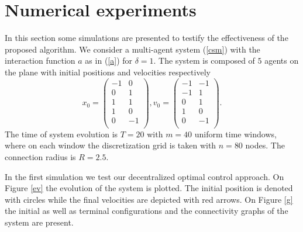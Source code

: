 \documentclass[a4paper,10pt, english]{article}
\begin{document}
 \section{Numerical experiments}
In this section some simulations are presented to testify the effectiveness of the proposed algorithm. We consider a multi-agent system (\ref{csm}) with the interaction function 
$a$ as in (\ref{a}) for $\delta = 1$. The system is composed of $5$
agents on the plane with initial positions and velocities respectively
\[x_0 =  \left( \begin{array}{cc}
		  -1  &   0\\
           0  &   1\\
           1  &   1\\
           1  &   0\\
           0 &   -1\\
\end{array} \right),
%
v_0 = 
\left( \begin{array}{cc}
	     -1&  -1\\
	     -1&   1\\
	      0&   1\\
	      1&   0\\
	      0&  -1\\
\end{array} \right).
\]
The time of system evolution is $T = 20$ with  $m = 40$ uniform time windows, where  on each window the discretization grid
is taken with $n = 80$ nodes.  The connection radius is $R = 2.5$. 

In the first simulation we test our decentralized optimal control approach. On Figure \ref{ev} the evolution of the system is plotted. The initial position
is denoted with circles while the final velocities are depicted with red arrows. On Figure \ref{g} the initial as well as terminal configurations and the connectivity graphs of the system are present.
\end{document}

